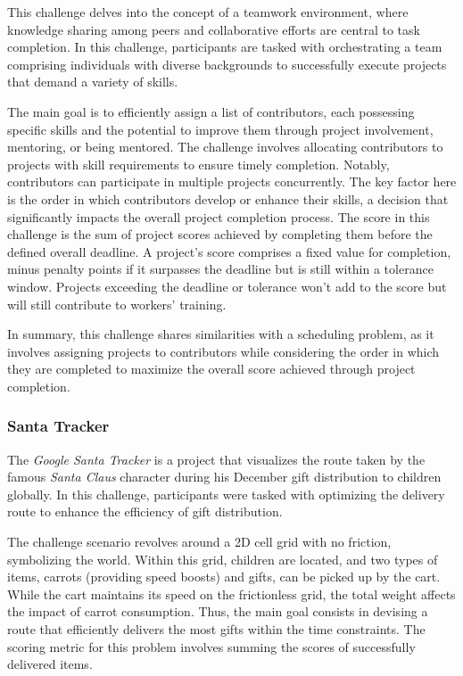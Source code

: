 This challenge delves into the concept of a teamwork environment, where
knowledge sharing among peers and collaborative efforts are central to task
completion. In this challenge, participants are tasked with orchestrating a team
comprising individuals with diverse backgrounds to successfully execute projects
that demand a variety of skills.

The main goal is to efficiently assign a list of contributors, each possessing
specific skills and the potential to improve them through project involvement,
mentoring, or being mentored. The challenge involves allocating contributors to
projects with skill requirements to ensure timely completion. Notably,
contributors can participate in multiple projects concurrently. The key factor
here is the order in which contributors develop or enhance their skills, a
decision that significantly impacts the overall project completion process.
The score in this challenge is the sum of project scores achieved by completing
them before the defined overall deadline. A project's score comprises a fixed
value for completion, minus penalty points if it surpasses the deadline but is
still within a tolerance window. Projects exceeding the deadline or tolerance won't
add to the score but will still contribute to workers' training.

In summary, this challenge shares similarities with a scheduling problem, as it
involves assigning projects to contributors while considering the order in which
they are completed to maximize the overall score achieved through project
completion.

\subsubsection*{Santa Tracker}
\label{subsubsec:hashcode-2022-final}

The \textit{Google Santa Tracker} is a project that visualizes the route taken
by the famous \textit{Santa Claus} character during his December gift
distribution to children globally. In this challenge, participants were tasked
with optimizing the delivery route to enhance the efficiency of gift
distribution.

The challenge scenario revolves around a 2D cell grid with no friction,
symbolizing the world. Within this grid, children are located, and two types of
items, carrots (providing speed boosts) and gifts, can be picked up by the cart.
While the cart maintains its speed on the frictionless grid, the total weight
affects the impact of carrot consumption. Thus, the main goal consists in
devising a route that efficiently delivers the most gifts within the time
constraints. The scoring metric for this problem involves summing the scores of
successfully delivered items.

